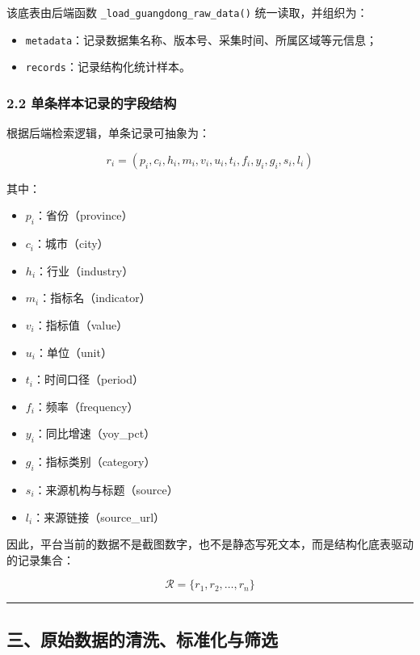 \documentclass[
]{article}
\providecommand{\tightlist}{%
  \setlength{\itemsep}{0pt}\setlength{\parskip}{0pt}}
\begin{document}
该底表由后端函数 \texttt{\_load\_guangdong\_raw\_data()}
统一读取，并组织为：

\begin{itemize}
\tightlist
\item
  \texttt{metadata}：记录数据集名称、版本号、采集时间、所属区域等元信息；
\item
  \texttt{records}：记录结构化统计样本。
\end{itemize}

\subsubsection{2.2
单条样本记录的字段结构}\label{ux5355ux6761ux6837ux672cux8bb0ux5f55ux7684ux5b57ux6bb5ux7ed3ux6784}

根据后端检索逻辑，单条记录可抽象为：

\[
r_i = \left( p_i, c_i, h_i, m_i, v_i, u_i, t_i, f_i, y_i, g_i, s_i, l_i \right)
\]

其中：

\begin{itemize}
\tightlist
\item
  \(p_i\)：省份（province）
\item
  \(c_i\)：城市（city）
\item
  \(h_i\)：行业（industry）
\item
  \(m_i\)：指标名（indicator）
\item
  \(v_i\)：指标值（value）
\item
  \(u_i\)：单位（unit）
\item
  \(t_i\)：时间口径（period）
\item
  \(f_i\)：频率（frequency）
\item
  \(y_i\)：同比增速（yoy\_pct）
\item
  \(g_i\)：指标类别（category）
\item
  \(s_i\)：来源机构与标题（source）
\item
  \(l_i\)：来源链接（source\_url）
\end{itemize}

因此，平台当前的数据不是截图数字，也不是静态写死文本，而是结构化底表驱动的记录集合：

\[
\mathcal{R} = \{r_1, r_2, \dots, r_n\}
\]

\begin{center}\rule{0.5\linewidth}{0.5pt}\end{center}

\subsection{三、原始数据的清洗、标准化与筛选}\label{ux4e09ux539fux59cbux6570ux636eux7684ux6e05ux6d17ux6807ux51c6ux5316ux4e0eux7b5bux9009}
\end{document}
